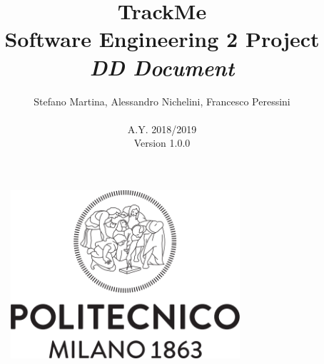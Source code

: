 \documentclass{article}
\begin{document}
	\begin{figure}[t]
	\centering
	\includegraphics[height=6.25cm,keepaspectratio]{Figures/logo}
	\end{figure}
	
	\title{TrackMe \\ Software Engineering 2 Project \\ 
			\textit{DD Document} }
	\author{Stefano Martina, Alessandro Nichelini, Francesco Peressini
		\\ \\ A.Y. 2018/2019 \\ Version 1.0.0}
		
\maketitle
\newpage

\tableofcontents
\newpage
 
\end{document}
